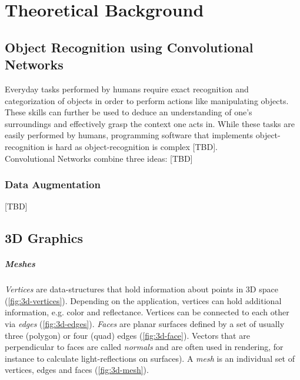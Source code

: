 

\chapter{Theoretical Background}

\section{Object Recognition using Convolutional Networks}
Everyday tasks performed by humans require exact recognition and categorization of objects in order to perform actions like manipulating objects. 
These skills can further be used to deduce an understanding of one's surroundings and effectively grasp the context one acts in. While these tasks are easily performed by humans, programming software that implements object-recognition is hard as object-recognition is complex [TBD].\\
Convolutional Networks combine three ideas: [TBD]

\subsection{Data Augmentation}
[TBD]

\section{3D Graphics}
\paragraph{Meshes} \textit{Vertices} are data-structures that hold information about points in 3D space (\ref{fig:3d-vertices}). Depending on the application, vertices can hold additional information, e.g. color and reflectance. Vertices can be connected to each other via \textit{edges} (\ref{fig:3d-edges}). \textit{Faces} are planar surfaces defined by a set of usually three (polygon) or four (quad) edges (\ref{fig:3d-face}). Vectors that are perpendicular to faces are called \textit{normals} and are often used in rendering, for instance to calculate light-reflections on surfaces). A \textit{mesh} is an individual set of vertices, edges and faces (\ref{fig:3d-mesh}). 

